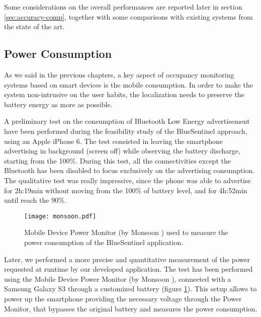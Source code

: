\medskip
Some considerations on the overall performances are reported later in section \ref{sec:accuracy-comp}, together with some comparisons with existing systems from the state of the art.


\subsection{Power Consumption}
\label{sec:test-consumption}

As we said in the previous chapters, a key aspect of occupancy monitoring systems based on smart devices is the mobile consumption. In order to make the system non-intrusive on the user habits, the localization needs to preserve the battery energy as more as possible.

A preliminary test on the consumption of Bluetooth Low Energy advertisement have been performed during the feasibility study of the BlueSentinel approach, using an Apple iPhone 6. The test consisted in leaving the smartphone advertising in background (screen off) while observing the battery discharge, starting from the 100\%. During this test, all the connectivities except the Bluetooth has been disabled to focus exclusively on the advertising consumption. The qualitative test was really impressive, since the phone was able to advertise for 2h:19min without moving from the 100\% of battery level, and for 4h:52min until reach the 90\%.
\smallskip

\begin{figure}[h!tb]
\centering\texttt{[image: monsoon.pdf]}
\caption{Mobile Device Power Monitor (by Monsoon \textregistered) used to measure the power consumption of the BlueSentinel application.}
\label{fig:monsoon}
\end{figure}

Later, we performed a more precise and quantitative measurement of the power requested at runtime by our developed application.
The test has been performed using the Mobile Device Power Monitor (by Monsoon \textregistered), connected with a Samsung Galaxy S3 through a customized battery (figure \ref{fig:monsoon}). This setup allows to power up the smartphone providing the necessary voltage through the Power Monitor, that bypasses the original battery and measures the power consumption.

